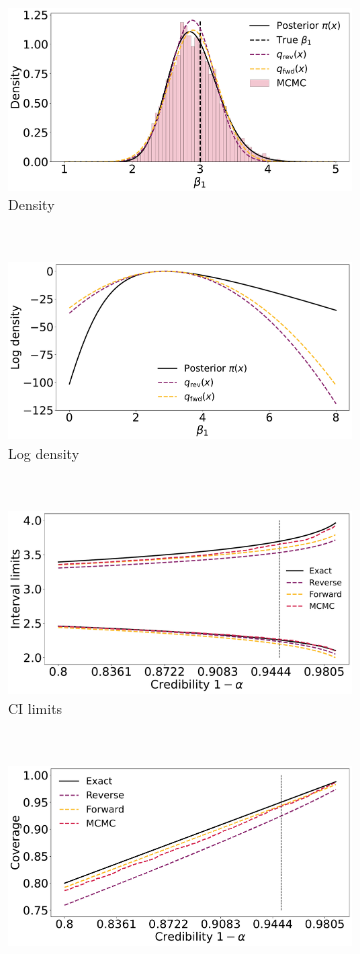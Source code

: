 \begin{figure}[ht]
    \begin{subfigure}{\linewidth}
    \centering
    \includegraphics[width=0.6\linewidth]{fig/logreg_q.pdf}
    \caption{Density}
    \label{fig:logreg_p}
    \end{subfigure}\\[1ex]
    \begin{subfigure}{\linewidth}
        \centering
        \includegraphics[width=0.6\linewidth]{fig/logreg_logq.pdf}
        \caption{Log density}
        \label{fig:logreg_lp}
        \end{subfigure}\\[1ex]
    \begin{subfigure}{\linewidth}
    \centering
    \includegraphics[width=0.6\linewidth]{fig/logreg_cilims.pdf}
    \caption{CI limits}
    \label{fig:logreg_lims}
    \end{subfigure}\\[1ex]
    \begin{subfigure}{\linewidth}
    \centering
    \includegraphics[width=0.6\linewidth]{fig/logreg_cicoverage.pdf}

\end{subfigure}
\end{figure}
